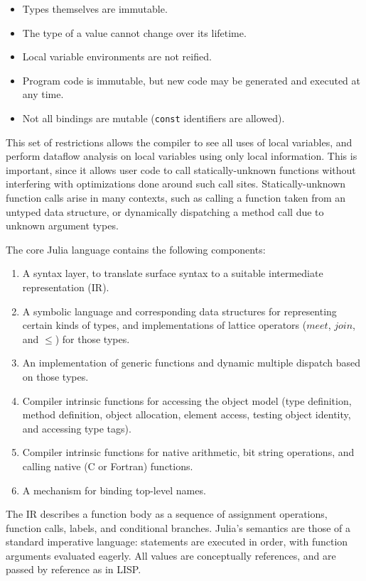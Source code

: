 \documentclass[9pt]{sigplanconf}
\begin{document}
\begin{itemize}
\item Types themselves are immutable.
\item The type of a value cannot change over its lifetime.
\item Local variable environments are not reified.
\item Program code is immutable, but new code may be generated and executed at any time.
\item Not all bindings are mutable ({\tt const} identifiers are allowed).
\end{itemize}

This set of restrictions allows the compiler to see all uses of local
variables, and perform dataflow analysis on local variables using only
local information. This is important, since it allows user code to call
statically-unknown functions without interfering with optimizations done
around such call sites. Statically-unknown function calls arise in
many contexts, such as calling a function taken from an untyped data structure,
or dynamically dispatching a method call due to unknown argument types.

The core Julia language contains the following components:

\begin{enumerate}
\item A syntax layer, to translate surface syntax to a suitable
intermediate representation (IR).
\item A symbolic language and corresponding data structures for representing
certain kinds of types, and implementations of lattice operators ($meet$,
$join$, and $\leq$) for those types.
\item An implementation of generic functions and dynamic multiple dispatch
based on those types.
\item Compiler intrinsic functions for accessing the object model
(type definition, method definition, object allocation, element access,
testing object identity, and accessing type tags).
\item Compiler intrinsic functions for native arithmetic, bit string operations,
and calling native (C or Fortran) functions.
\item A mechanism for binding top-level names.
\end{enumerate}

The IR describes a function body as a sequence of assignment operations,
function calls, labels, and conditional branches. Julia's semantics
are those of a standard imperative language: statements are executed in order,
with function arguments evaluated eagerly. All values are conceptually
references, and are passed by reference as in LISP.
\end{document}
